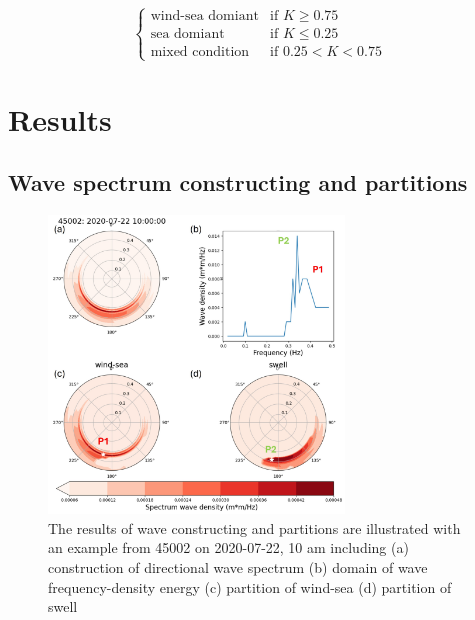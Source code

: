 \begin{equation}
\begin{cases}
\text{wind-sea domiant} & \text{if } K \geq 0.75 \\
\text{sea domiant} & \text{if } K \leq 0.25 \\
\text{mixed condition} & \text{if } 0.25 < K < 0.75
\end{cases}
\label{eq:eq4.10}
\end{equation}

\section{Results}
\label{c4_results}

\subsection{Wave spectrum constructing and partitions}
\label{Wave spectrum constructing and partitions}

\begin{figure}[htbp]
  \centering
  \includegraphics[width=0.7\textwidth]{chapter4/resources/figure4-6.jpg}
  \caption{The results of wave constructing and partitions are illustrated with
  an example from 45002 on 2020-07-22, 10 am including (a) construction of
  directional wave spectrum (b) domain of wave frequency-density energy (c)
  partition of wind-sea (d) partition of swell}
  \label{fig:fig4.6}
\end{figure}



